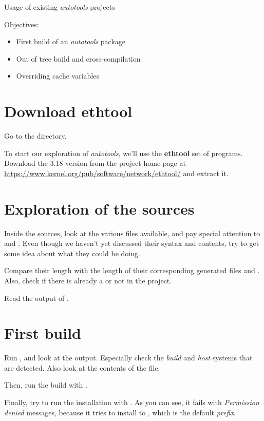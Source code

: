 \subchapter
{Usage of existing {\em autotools} projects}
{Objectives:
  \begin{itemize}
  \item First build of an {\em autotools} package
  \item Out of tree build and cross-compilation
  \item Overriding cache variables
  \end{itemize}
}

\section{Download ethtool}

Go to the  directory.

To start our exploration of {\em autotools}, we'll use the {\bf
  ethtool} set of programs. Download the 3.18 version from the project
home page at
\url{https://www.kernel.org/pub/software/network/ethtool/} and extract
it.

\section{Exploration of the sources}

Inside the sources, look at the various files available, and pay
special attention to  and . Even
though we haven't yet discussed their syntax and contents, try to get
some idea about what they could be doing.

Compare their length with the length of their corresponding generated
files  and . Also, check if there is
already a  or not in the project.

Read the output of .

\section{First build}

Run , and look at the output. Especially check the
{\em build} and {\em host} systems that are detected. Also look at the
contents of the  file.

Then, run the build with .

Finally, try to run the installation with . As you
can see, it fails with {\em Permission denied} messages, because it
tries to install to , which is the default {\em
  prefix}.


